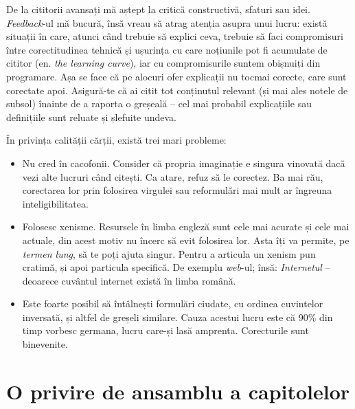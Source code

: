 De la cititorii avansați mă aștept la critică constructivă, sfaturi sau idei.
\textsl{Feedback}-ul mă bucură, însă vreau să atrag atenția asupra unui lucru:
există situații în care, atunci când trebuie să explici ceva, trebuie să
faci compromisuri între corectitudinea tehnică și ușurința cu care noțiunile
pot fi acumulate de cititor (en. \textsl{the learning curve}), iar cu compromisurile
suntem obișnuiți din programare. Așa se face că pe alocuri ofer explicații
nu tocmai corecte, care sunt corectate apoi. Asigură-te că ai citit tot conținutul
relevant (și mai ales notele de subsol) înainte de a raporta o greșeală --
cel mai probabil explicațiile sau definițiile sunt reluate și șlefuite undeva.

În privința calității cărții, există trei mari probleme:
\begin{itemize}
\item Nu cred în cacofonii. Consider că propria imaginație e singura vinovată
dacă {\glqq}vezi{\grqq} alte lucruri când citești. Ca atare, refuz să le corectez.
Ba mai rău, corectarea lor prin folosirea virgulei sau reformulări mai mult
ar îngreuna inteligibilitatea.
\item Folosesc xenisme. Resursele în limba engleză sunt cele mai acurate și
cele mai actuale, din acest motiv nu încerc să evit folosirea lor.
Asta îți va permite, pe \textit{termen lung}, să te poți ajuta singur. Pentru a
articula un xenism pun cratimă, și apoi particula specifică. De exemplu
\textsl{web}-ul; însă: \textit{Internetul} -- deoarece cuvântul internet există în
limba română.
\item Este foarte posibil să întâlnești formulări ciudate, cu ordinea
cuvintelor inversată, și altfel de greșeli similare. Cauza acestui lucru este că
90\% din timp vorbesc germana, lucru care-și lasă amprenta.
Corecturile sunt binevenite.
\end{itemize}

{}
\section*{O privire de ansamblu a capitolelor}

